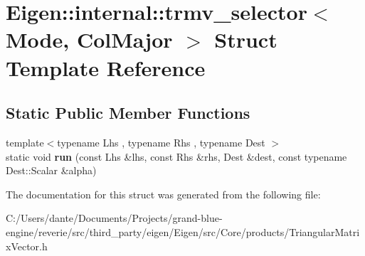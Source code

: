 \hypertarget{struct_eigen_1_1internal_1_1trmv__selector_3_01_mode_00_01_col_major_01_4}{}\section{Eigen\+::internal\+::trmv\+\_\+selector$<$ Mode, Col\+Major $>$ Struct Template Reference}
\label{struct_eigen_1_1internal_1_1trmv__selector_3_01_mode_00_01_col_major_01_4}
\subsection*{Static Public Member Functions}
\begin{DoxyCompactItemize}
\item 
\mbox{\label{struct_eigen_1_1internal_1_1trmv__selector_3_01_mode_00_01_col_major_01_4_a8759cece1c4d1c2ac7c77c21f3fbbfa0}} 
{\footnotesize template$<$typename Lhs , typename Rhs , typename Dest $>$ }\\static void {\bfseries run} (const Lhs \&lhs, const Rhs \&rhs, Dest \&dest, const typename Dest\+::\+Scalar \&alpha)
\end{DoxyCompactItemize}


The documentation for this struct was generated from the following file\+:\begin{DoxyCompactItemize}
\item 
C\+:/\+Users/dante/\+Documents/\+Projects/grand-\/blue-\/engine/reverie/src/third\+\_\+party/eigen/\+Eigen/src/\+Core/products/Triangular\+Matrix\+Vector.\+h\end{DoxyCompactItemize}
